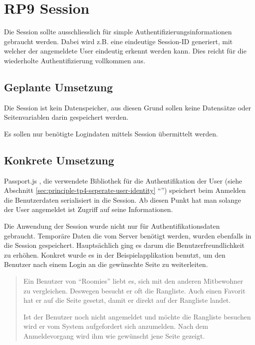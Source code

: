 \section{RP9 Session}
\label{sec:principle-rp9-session}

Die Session sollte ausschliesslich für simple Authentifizierungsinformationen gebraucht werden. Dabei wird z.B. eine eindeutige Session-ID generiert, mit welcher der angemeldete User eindeutig erkennt werden kann. Dies reicht für die wiederholte Authentifizierung vollkommen aus.

\subsection*{Geplante Umsetzung}
Die Session ist kein Datenspeicher, aus diesen Grund sollen keine Datensätze oder Seitenvariablen darin gespeichert werden.

Es sollen nur benötigte Logindaten mittels Session übermittelt werden.

\subsection*{Konkrete Umsetzung}
Passport.js \cite{Passportjs}, die verwendete Bibliothek für die Authentifikation der User (siehe Abschnitt \ref{sec:principle-tp4-seperate-user-identity} ``'') speichert beim Anmelden die Benutzerdaten serialisiert in die Session. Ab diesen Punkt hat man solange der User angemeldet ist Zugriff auf seine Informationen.

Die Anwendung der Session wurde nicht nur für Authentifikationsdaten gebraucht. Temporäre Daten die vom Server benötigt werden, wurden ebenfalls in die Session gespeichert. Hauptsächlich ging es darum die Benutzerfreundlichkeit zu erhöhen. Konkret wurde es in der Beispielapplikation benutzt, um den Benutzer nach einem Login an die gewünschte Seite zu weiterleiten.

\begin{quotation}
Ein Benutzer von ``Roomies'' liebt es, sich mit den anderen Mitbewohner zu vergleichen. Deswegen besucht er oft die Rangliste. Auch einen Favorit hat er auf die Seite gesetzt, damit er direkt auf der Rangliste landet.

Ist der Benutzer noch nicht angemeldet und möchte die Rangliste besuchen wird er vom System aufgefordert sich anzumelden. Nach dem Anmeldevorgang wird ihm wie gewünscht jene Seite gezeigt.
\end{quotation}

